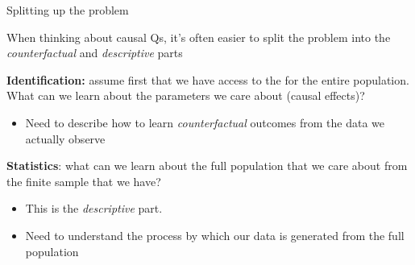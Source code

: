 \documentclass[11pt,english,handout]{beamer}
\newenvironment{wideitemize}{\itemize\addtolength{\itemsep}{10pt}}{\enditemize}
\begin{document}
\begin{frame}{Splitting up the problem}
	\begin{wideitemize}
		
		\item
		When thinking about causal Qs, it's often easier to split the problem into the \emph{counterfactual} and \emph{descriptive} parts
		
		\item
		\textbf{Identification:} assume first that we have access to the  for the entire population. What can we learn about the parameters we care about (causal effects)? 
		 
		\begin{itemize}
			\item 
			Need to describe how to learn \emph{counterfactual} outcomes from the data we actually observe
		\end{itemize}
		
		\item
		\textbf{Statistics}: what can we learn about the full population that we care about from the finite sample that we have? \\
			\begin{itemize}
				\item
				This is the \emph{descriptive} part.
				\item 
				Need to understand the process by which our data is generated from the full population
			\end{itemize} 	
		
	\end{wideitemize}	
	
\end{frame}
\end{document}
